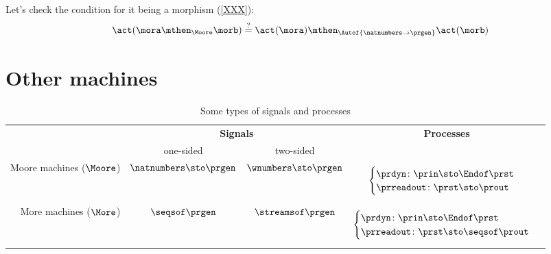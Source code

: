 Let's check the condition for it being a morphism (\cref{XXX}):
\begin{equation}
  \act ( \mora \mthen_{\Moore} \morb) \stackrel{?}{=}  \act ( \mora) \mthen_{\Autof  {\natnumbers \to \prgen}} \act(\morb)
\end{equation}


\section{Other machines}


\begin{table*}[b]
  \caption{Some types of signals and processes}
  \begin{tabular}{rccc}
  & \multicolumn{2}{c}{\textbf{Signals}} & \textbf{Processes} \\
  &\rule{0pt}{10pt} one-sided & two-sided &   \\
  Moore machines ($\Moore$) &
  $\natnumbers \sto \prgen$
  &
  $\wnumbers \sto \prgen$
  &
  \begin{minipage}{4cm}\raggedright
  \begin{equation*}\label{eq:a}
      \begin{cases}
      \prdyn \colon \prin \sto \Endof \prst \\
      \prreadout \colon \prst \sto \prout
      \end{cases}
  \end{equation*}
  \end{minipage}
  \\
  
  More machines ($\More$)& $\seqsof \prgen$ &  $\streamsof \prgen$ &
  \begin{minipage}{4cm}\raggedright
  \begin{equation*}
  \begin{cases}
  \prdyn \colon \prin \sto \Endof \prst \\
  \prreadout \colon \prst \sto \seqsof \prout
  \end{cases}
  \end{equation*}
  

\end{minipage}
\end{tabular}
\end{table*}
